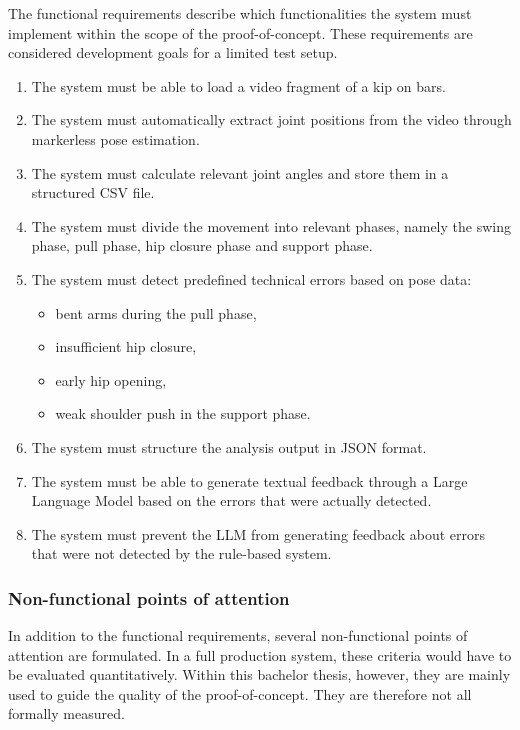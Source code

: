 The functional requirements describe which functionalities the system must implement within the scope of the proof-of-concept. These requirements are considered development goals for a limited test setup.

\begin{enumerate}
    \item The system must be able to load a video fragment of a kip on bars.
    \item The system must automatically extract joint positions from the video through markerless pose estimation.
    \item The system must calculate relevant joint angles and store them in a structured CSV file.
    \item The system must divide the movement into relevant phases, namely the swing phase, pull phase, hip closure phase and support phase.
    \item The system must detect predefined technical errors based on pose data:
    \begin{itemize}
        \item bent arms during the pull phase,
        \item insufficient hip closure,
        \item early hip opening,
        \item weak shoulder push in the support phase.
    \end{itemize}
    \item The system must structure the analysis output in JSON format.
    \item The system must be able to generate textual feedback through a Large Language Model based on the errors that were actually detected.
    \item The system must prevent the LLM from generating feedback about errors that were not detected by the rule-based system.
\end{enumerate}

\subsubsection{Non-functional points of attention}

In addition to the functional requirements, several non-functional points of attention are formulated. In a full production system, these criteria would have to be evaluated quantitatively. Within this bachelor thesis, however, they are mainly used to guide the quality of the proof-of-concept. They are therefore not all formally measured.

